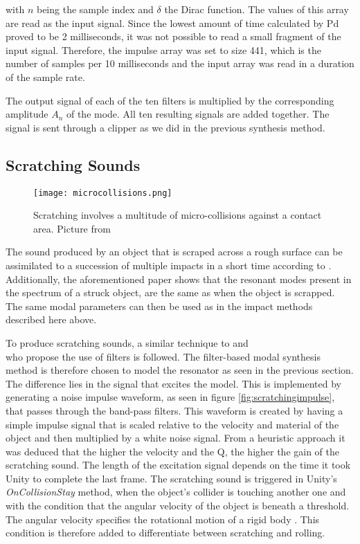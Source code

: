 with $n$ being the sample index and $\delta$ the Dirac function. The values of this array are read as the input signal. Since the lowest amount of time calculated by \gls{Pd} proved to be 2 milliseconds, it was not possible to read a small fragment of the input signal. Therefore, the impulse array was set to size 441, which is the number of samples per 10 milliseconds and the input array was read in a duration of the sample rate.

The output signal of each of the ten filters is multiplied by the corresponding amplitude $A_n$ of the mode. All ten resulting signals are added together. The signal is sent through a clipper as we did in the previous synthesis method.

\subsection{Scratching Sounds}\label{sec:scratching_synth}

\begin{figure}[H]
  \centering
    \texttt{[image: microcollisions.png]}
      \caption{Scratching involves a multitude of micro-collisions against a contact area. Picture from \cite{gaver1993we}}
      \label{fig:microcollisions}
\end{figure}

The sound produced by an object that is scraped across a rough surface can be assimilated to a succession of multiple impacts in a short time according to \cite{gaver1993we}. Additionally, the aforementioned paper shows that the resonant modes present in the spectrum of a struck object, are the same as when the object is scrapped. The same modal parameters can then be used as in the impact methods described here above.

To produce scratching sounds, a similar technique to \cite{gaver1993we} and \\ \cite{van2001foleyautomatic} who propose the use of filters is followed. The filter-based modal synthesis method is therefore chosen to model the resonator as seen in the previous section. The difference lies in the signal that excites the model. This is implemented by generating a noise impulse waveform, as seen in figure \ref{fig:scratchingimpulse}, that passes through the band-pass filters. This waveform is created by having a simple impulse signal that is scaled relative to the velocity and material of the object and then multiplied by a white noise signal. From a heuristic approach it was deduced that the higher the velocity and the \gls{Q}, the higher the gain of the scratching sound. The length of the excitation signal depends on the time it took Unity\textsuperscript{\textregistered} to complete the last frame. The scratching sound is triggered in Unity\textsuperscript{\textregistered}'s \textit{OnCollisionStay} \cite{bib:unity_doc} method, when the object's collider is touching another one and with the condition that the angular velocity of the object is beneath a threshold. The angular velocity specifies the rotational motion of a rigid body \cite{sears1964university}. This condition is therefore added to differentiate between scratching and rolling.

